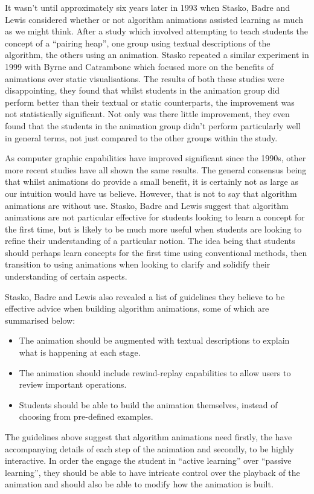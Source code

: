 \documentclass{l4proj}
\begin{document}
It wasn't until approximately six years later in 1993 when Stasko, Badre and Lewis considered whether or not algorithm animations assisted learning as much as we might think\cite{StaskoBadreLewis}. After a study which involved attempting to teach students the concept of a ``pairing heap'', one group using textual descriptions of the algorithm, the others using an animation. Stasko repeated a similar experiment in 1999 with Byrne and Catrambone which focused more on the benefits of animations over static visualisations. The results of both these studies were disappointing, they found that whilst students in the animation group did perform better than their textual or static counterparts, the improvement was not statistically significant. Not only was there little improvement, they even found that the students in the animation group didn't perform particularly well in general terms, not just compared to the other groups within the study. 

As computer graphic capabilities have improved significant since the 1990s, other more recent studies have all shown the same results. The general consensus being that whilst animations do provide a small benefit, it is certainly not as large as our intuition would have us believe. However, that is not to say that algorithm animations are without use. Stasko, Badre and Lewis suggest that algorithm animations are not particular effective for students looking to learn a concept for the first time, but is likely to be much more useful when students are looking to refine their understanding of a particular notion. The idea being that students should perhaps learn concepts for the first time using conventional methods, then transition to using animations when looking to clarify and solidify their understanding of certain aspects.

Stasko, Badre and Lewis also revealed a list of guidelines they believe to be effective advice when building algorithm animations, some of which are summarised below:
\begin{itemize}
\item The animation should be augmented with textual descriptions to explain what is happening at each stage.
\item The animation should include rewind-replay capabilities to allow users to review important operations.
\item Students should be able to build the animation themselves, instead of choosing from pre-defined examples.
\end{itemize}
The guidelines above suggest that algorithm animations need firstly, the have accompanying details of each step of the animation and secondly, to be highly interactive. In order the engage the student in ``active learning'' over ``passive learning'', they should be able to have intricate control over the playback of the animation and should also be able to modify how the animation is built.
\end{document}
